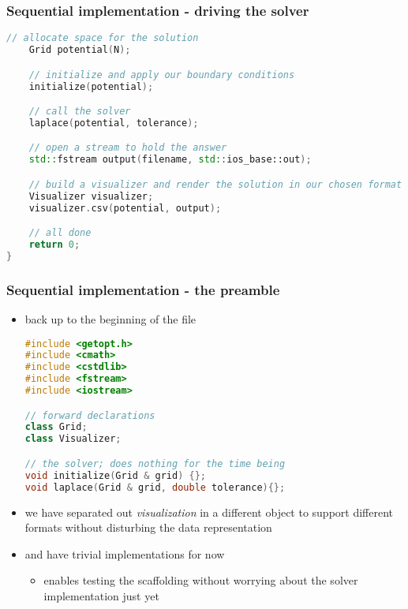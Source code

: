 %
%
%
%


\begin{frame}[fragile]
%
  \frametitle{Sequential implementation - driving the solver}
%
  \begin{lstlisting}[language=c++,name=seq:frame]
    // allocate space for the solution
    Grid potential(N);

    // initialize and apply our boundary conditions
    initialize(potential);

    // call the solver
    laplace(potential, tolerance);

    // open a stream to hold the answer
    std::fstream output(filename, std::ios_base::out);

    // build a visualizer and render the solution in our chosen format
    Visualizer visualizer;
    visualizer.csv(potential, output);

    // all done
    return 0;
}
  \end{lstlisting}
% 
\end{frame}

\begin{frame}[fragile]
%
  \frametitle{Sequential implementation - the preamble}
%
  \begin{itemize}
  \item back up to the beginning of the file
    \begin{lstlisting}[language=c++,name=seq:frame, firstnumber=1]
#include <getopt.h>
#include <cmath>
#include <cstdlib>
#include <fstream>
#include <iostream>

// forward declarations
class Grid;
class Visualizer;

// the solver; does nothing for the time being
void initialize(Grid & grid) {};
void laplace(Grid & grid, double tolerance){};

    \end{lstlisting}
%
  \item we have separated out {\em visualization} in a different object to support different
    formats without disturbing the data representation
%
  \item {} and  have trivial implementations for now
    \begin{itemize}
    \item enables testing the scaffolding without worrying about the solver
      implementation just yet
    \end{itemize}
  \end{itemize}
% 
\end{frame}

